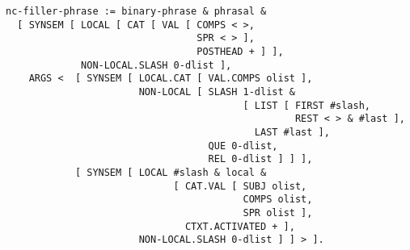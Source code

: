 \documentclass[a4paper]{article}
\begin{document}
{\small\begin{verbatim}
nc-filler-phrase := binary-phrase & phrasal &
  [ SYNSEM [ LOCAL [ CAT [ VAL [ COMPS < >,
                                 SPR < > ],
                                 POSTHEAD + ] ],
             NON-LOCAL.SLASH 0-dlist ],
    ARGS <  [ SYNSEM [ LOCAL.CAT [ VAL.COMPS olist ],
                       NON-LOCAL [ SLASH 1-dlist &
                                         [ LIST [ FIRST #slash,
                                                  REST < > & #last ],
                                           LAST #last ],
                                   QUE 0-dlist,
                                   REL 0-dlist ] ] ],
            [ SYNSEM [ LOCAL #slash & local &
                             [ CAT.VAL [ SUBJ olist,
                                         COMPS olist,
                                         SPR olist ],
                               CTXT.ACTIVATED + ],
                       NON-LOCAL.SLASH 0-dlist ] ] > ].
\end{verbatim}}
\end{document}
